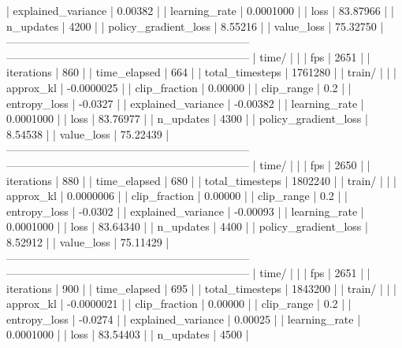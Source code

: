 |    explained_variance   |      0.00382 |
|    learning_rate        |    0.0001000 |
|    loss                 |     83.87966 |
|    n_updates            |         4200 |
|    policy_gradient_loss |      8.55216 |
|    value_loss           |     75.32750 |
------------------------------------------------------------------
------------------------------------------------------------------
| time/                   |              |
|    fps                  |         2651 |
|    iterations           |          860 |
|    time_elapsed         |          664 |
|    total_timesteps      |      1761280 |
| train/                  |              |
|    approx_kl            |   -0.0000025 |
|    clip_fraction        |      0.00000 |
|    clip_range           |          0.2 |
|    entropy_loss         |      -0.0327 |
|    explained_variance   |     -0.00382 |
|    learning_rate        |    0.0001000 |
|    loss                 |     83.76977 |
|    n_updates            |         4300 |
|    policy_gradient_loss |      8.54538 |
|    value_loss           |     75.22439 |
------------------------------------------------------------------
------------------------------------------------------------------
| time/                   |              |
|    fps                  |         2650 |
|    iterations           |          880 |
|    time_elapsed         |          680 |
|    total_timesteps      |      1802240 |
| train/                  |              |
|    approx_kl            |    0.0000006 |
|    clip_fraction        |      0.00000 |
|    clip_range           |          0.2 |
|    entropy_loss         |      -0.0302 |
|    explained_variance   |     -0.00093 |
|    learning_rate        |    0.0001000 |
|    loss                 |     83.64340 |
|    n_updates            |         4400 |
|    policy_gradient_loss |      8.52912 |
|    value_loss           |     75.11429 |
------------------------------------------------------------------
------------------------------------------------------------------
| time/                   |              |
|    fps                  |         2651 |
|    iterations           |          900 |
|    time_elapsed         |          695 |
|    total_timesteps      |      1843200 |
| train/                  |              |
|    approx_kl            |   -0.0000021 |
|    clip_fraction        |      0.00000 |
|    clip_range           |          0.2 |
|    entropy_loss         |      -0.0274 |
|    explained_variance   |      0.00025 |
|    learning_rate        |    0.0001000 |
|    loss                 |     83.54403 |
|    n_updates            |         4500 |
